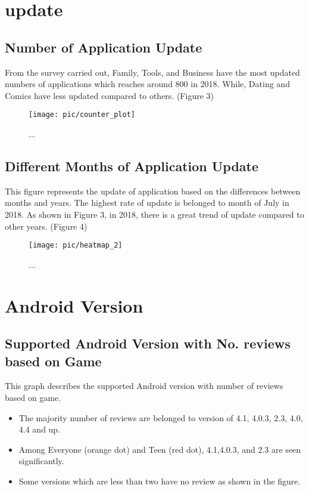 \section*{update}
\subsection*{Number of Application Update}
From the survey carried out, Family, Tools, and Business have the most updated numbers of applications which reaches around 800 in 2018. While, Dating and Comics have less updated compared to others. (Figure 3)  
\begin{figure}
\centering
\texttt{[image: pic/counter\_plot]}
\caption{... }
\label{fig:3}
\end{figure}

\subsection*{Different Months of Application Update}
This figure represents the update of application based on the differences between months and years. The highest rate of update is belonged to month of July in 2018. As shown in Figure 3, in 2018, there is a great trend of update compared to other years. (Figure 4)
\begin{figure}
\centering
\texttt{[image: pic/heatmap\_2]}
\caption{... }
\label{fig:4}
\end{figure}

\section*{Android Version}
\subsection*{Supported Android Version with No. reviews based on Game}
This graph describes the supported Android version with number of reviews based on game.
\begin{itemize}
\item The majority number of reviews are belonged to version of 4.1, 4.0.3, 2.3, 4.0, 4.4 and up.\\
\item Among Everyone (orange dot) and Teen (red dot), 4.1,4.0.3, and 2.3 are seen significantly.\\
\item Some versions which are less than two have no review as shown in the figure.\\
\end{itemize}

